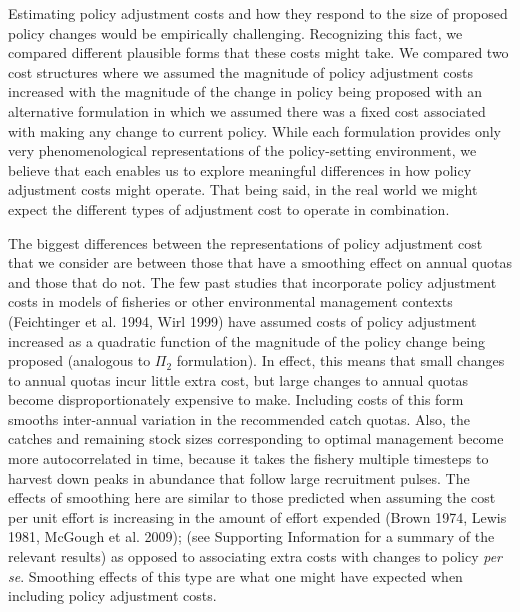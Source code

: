 \documentclass[review,12pt,author-year,titlepage]{components/elsarticle} %
\begin{document}
\begin{flushleft}
Estimating policy adjustment costs and how they respond to the size of
proposed policy changes would be empirically challenging. Recognizing
this fact, we compared different plausible forms that these costs might
take. We compared two cost structures where we assumed the magnitude of
policy adjustment costs increased with the magnitude of the change in
policy being proposed with an alternative formulation in which we
assumed there was a fixed cost associated with making any change to
current policy. While each formulation provides only very
phenomenological representations of the policy-setting environment, we
believe that each enables us to explore meaningful differences in how
policy adjustment costs might operate. That being said, in the real
world we might expect the different types of adjustment cost to operate
in combination.

The biggest differences between the representations of policy adjustment
cost that we consider are between those that have a smoothing effect on
annual quotas and those that do not. The few past studies that
incorporate policy adjustment costs in models of fisheries or other
environmental management contexts (Feichtinger et al. 1994, Wirl 1999)
have assumed costs of policy adjustment increased as a quadratic
function of the magnitude of the policy change being proposed (analogous
to \(\Pi_2\) formulation). In effect, this means that small changes to
annual quotas incur little extra cost, but large changes to annual
quotas become disproportionately expensive to make. Including costs of
this form smooths inter-annual variation in the recommended catch
quotas. Also, the catches and remaining stock sizes corresponding to
optimal management become more autocorrelated in time, because it takes
the fishery multiple timesteps to harvest down peaks in abundance that
follow large recruitment pulses. The effects of smoothing here are
similar to those predicted when assuming the cost per unit effort is
increasing in the amount of effort expended (Brown 1974, Lewis 1981,
McGough et al. 2009); (see Supporting Information for a summary of the
relevant results) as opposed to associating extra costs with changes to
policy \emph{per se}. Smoothing effects of this type are what one might
have expected when including policy adjustment costs.


\end{flushleft}
\end{document}
